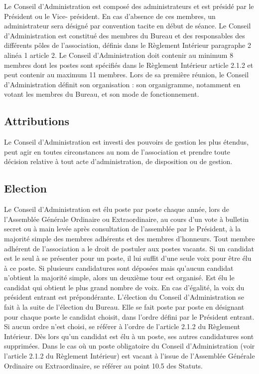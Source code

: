 \documentclass[12pt]{article}
\begin{document}
Le Conseil d’Administration est composé des administrateurs et est présidé par le Président ou le Vice-
président. En cas d’absence de ces membres, un administrateur sera désigné par convention tacite en début
de séance.
Le Conseil d’Administration est constitué des membres du Bureau et des responsables des différents pôles de
l’association, définis dans le Règlement Intérieur paragraphe 2 alinéa 1 article 2.
Le Conseil d’Administration doit contenir au minimum 8 membres dont les postes sont spécifiés dans le
Règlement Intérieur article 2.1.2 et peut contenir au maximum 11 membres.
Lors de sa première réunion, le Conseil d’Administration définit son organisation : son organigramme,
notamment en votant les membres du Bureau, et son mode de fonctionnement.

\subsection{Attributions}
\label{sec:conseil:attributions}

Le Conseil d’Administration est investi des pouvoirs de gestion les plus étendus, peut agir en toutes
circonstances au nom de l’association et prendre toute décision relative à tout acte d’administration, de
disposition ou de gestion.

\subsection{Election}
\label{sec:conseil:election}

Le Conseil d’Administration est élu poste par poste chaque année, lors de l’Assemblée Générale Ordinaire ou
Extraordinaire, au cours d’un vote à bulletin secret ou à main levée après consultation de l’assemblée par le
Président, à la majorité simple des membres adhérents et des membres d’honneurs. Tout membre adhérent
de l’association a le droit de postuler aux postes vacants.
Si un candidat est le seul à se présenter pour un poste, il lui suffit d’une seule voix pour être élu à ce poste. Si
plusieurs candidatures sont déposées mais qu’aucun candidat n’obtient la majorité simple, alors un
deuxième tour est organisé. Est élu le candidat qui obtient le plus grand nombre de voix. En cas d’égalité, la
voix du président entrant est prépondérante.
L’élection du Conseil d’Administration se fait à la suite de l’élection du Bureau. Elle se fait poste par poste en
désignant pour chaque poste le candidat choisit, dans l’ordre défini par le Président entrant. Si aucun ordre
n’est choisi, se référer à l’ordre de l’article 2.1.2 du Règlement Intérieur. Dès lors qu’un candidat est élu à un
poste, ses autres candidatures sont supprimées.
Dans le cas où un poste obligatoire du Conseil d’Administration (voir l’article 2.1.2 du Règlement Intérieur)
est vacant à l’issue de l’Assemblée Générale Ordinaire ou Extraordinaire, se référer au point 10.5 des
Statuts.
\end{document}
